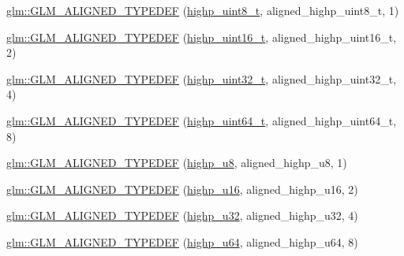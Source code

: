 \begin{DoxyCompactItemize}
\item 
\mbox{\hyperlink{group__gtx__type__aligned_gaff50b10dd1c48be324fdaffd18e2c7ea}{glm\+::\+G\+L\+M\+\_\+\+A\+L\+I\+G\+N\+E\+D\+\_\+\+T\+Y\+P\+E\+D\+EF}} (\mbox{\hyperlink{group__gtc__type__precision_ga9ba529fcc75b82d23da979f0ce6e4518}{highp\+\_\+uint8\+\_\+t}}, aligned\+\_\+highp\+\_\+uint8\+\_\+t, 1)
\item 
\mbox{\hyperlink{group__gtx__type__aligned_ga9fc4421dbb833d5461e6d4e59dcfde55}{glm\+::\+G\+L\+M\+\_\+\+A\+L\+I\+G\+N\+E\+D\+\_\+\+T\+Y\+P\+E\+D\+EF}} (\mbox{\hyperlink{group__gtc__type__precision_ga3145bc0ee80432c165e985a188a722b3}{highp\+\_\+uint16\+\_\+t}}, aligned\+\_\+highp\+\_\+uint16\+\_\+t, 2)
\item 
\mbox{\hyperlink{group__gtx__type__aligned_ga329f1e2b94b33ba5e3918197030bcf03}{glm\+::\+G\+L\+M\+\_\+\+A\+L\+I\+G\+N\+E\+D\+\_\+\+T\+Y\+P\+E\+D\+EF}} (\mbox{\hyperlink{group__gtc__type__precision_ga8eb85ad460079c63b68866ae34637bda}{highp\+\_\+uint32\+\_\+t}}, aligned\+\_\+highp\+\_\+uint32\+\_\+t, 4)
\item 
\mbox{\hyperlink{group__gtx__type__aligned_ga71e646f7e301aa422328194162c9c998}{glm\+::\+G\+L\+M\+\_\+\+A\+L\+I\+G\+N\+E\+D\+\_\+\+T\+Y\+P\+E\+D\+EF}} (\mbox{\hyperlink{group__gtc__type__precision_ga6e66f40c5909bfc872b068187fa6029e}{highp\+\_\+uint64\+\_\+t}}, aligned\+\_\+highp\+\_\+uint64\+\_\+t, 8)
\item 
\mbox{\hyperlink{group__gtx__type__aligned_ga8942e09f479489441a7a5004c6d8cb66}{glm\+::\+G\+L\+M\+\_\+\+A\+L\+I\+G\+N\+E\+D\+\_\+\+T\+Y\+P\+E\+D\+EF}} (\mbox{\hyperlink{group__gtc__type__precision_ga8a60abe782749c504fb5ae51eb8b49cc}{highp\+\_\+u8}}, aligned\+\_\+highp\+\_\+u8, 1)
\item 
\mbox{\hyperlink{group__gtx__type__aligned_gaab32497d6e4db16ee439dbedd64c5865}{glm\+::\+G\+L\+M\+\_\+\+A\+L\+I\+G\+N\+E\+D\+\_\+\+T\+Y\+P\+E\+D\+EF}} (\mbox{\hyperlink{group__gtc__type__precision_ga9da2178d7501d9c0f225fa1a7b70cb45}{highp\+\_\+u16}}, aligned\+\_\+highp\+\_\+u16, 2)
\item 
\mbox{\hyperlink{group__gtx__type__aligned_gaaadbb34952eca8e3d7fe122c3e167742}{glm\+::\+G\+L\+M\+\_\+\+A\+L\+I\+G\+N\+E\+D\+\_\+\+T\+Y\+P\+E\+D\+EF}} (\mbox{\hyperlink{group__gtc__type__precision_gae8e8a2c712653891a03c171795286ac5}{highp\+\_\+u32}}, aligned\+\_\+highp\+\_\+u32, 4)
\item 
\mbox{\hyperlink{group__gtx__type__aligned_ga92024d27c74a3650afb55ec8e024ed25}{glm\+::\+G\+L\+M\+\_\+\+A\+L\+I\+G\+N\+E\+D\+\_\+\+T\+Y\+P\+E\+D\+EF}} (\mbox{\hyperlink{group__gtc__type__precision_ga6006ea883d3c0491791650b2fb84de39}{highp\+\_\+u64}}, aligned\+\_\+highp\+\_\+u64, 8)

\end{DoxyCompactItemize}
